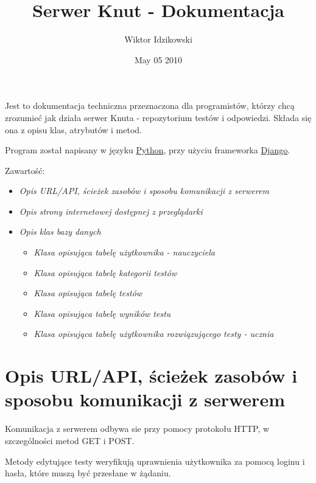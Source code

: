 \documentclass[letterpaper,10pt,polish]{manual}
\title{Serwer Knut - Dokumentacja}
\date{May 05 2010}
\author{Wiktor Idzikowski}
\begin{document}
\maketitle
\tableofcontents
\hypertarget{--doc-index}{}


Jest to dokumentacja techniczna przeznaczona dla programistów, którzy chcą zrozumieć jak działa serwer Knuta - repozytorium testów i odpowiedzi. Składa się ona z opisu klas, atrybutów i metod.

Program został napisany w języku \href{http://python.org}{Python}, przy użyciu frameworka \href{http://www.djangoproject.com/}{Django}.

Zawartość:
\begin{itemize}
\item {} 
\emph{Opis URL/API, ścieżek zasobów i sposobu komunikacji z serwerem}

\item {} 
\emph{Opis strony internetowej dostępnej z przeglądarki}

\item {} 
\emph{Opis klas bazy danych}
\begin{itemize}
\item {} 
\emph{Klasa opisująca tabelę użytkownika - nauczyciela}

\item {} 
\emph{Klasa opisująca tabelę kategorii testów}

\item {} 
\emph{Klasa opisująca tabelę testów}

\item {} 
\emph{Klasa opisująca tabelę wyników testu}

\item {} 
\emph{Klasa opisująca tabelę użytkownika rozwiązującego testy - ucznia}

\end{itemize}

\end{itemize}
\hypertarget{views}{}

\chapter{Opis URL/API, ścieżek zasobów i sposobu komunikacji z serwerem}

Komunikacja z serwerem odbywa sie przy pomocy protokołu HTTP, w szczególności metod GET i POST.

Metody edytujące testy weryfikują uprawnienia użytkownika za pomocą loginu i hasła, które muszą być przesłane w żądaniu.
\end{document}
